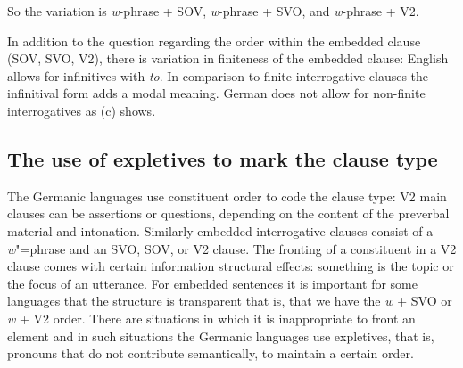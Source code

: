 So the variation is \emph{w}-phrase + SOV, \emph{w}-phrase + SVO, and \emph{w}-phrase + V2.

In addition to the question regarding the order within the embedded clause (SOV, SVO, V2), there is
variation in finiteness of the embedded clause:
\eal
\label{ex-what-to-read}
\zl
English allows for infinitives with \emph{to}. In comparison to finite interrogative clauses the
infinitival form adds a modal meaning. German does not allow for non-finite interrogatives as
(c) shows.



\subsection{The use of expletives to mark the clause type}
\label{sec-phen-use-of-expletives}

The Germanic languages use constituent order to code the clause type: V2 main clauses can be
assertions or questions, depending on the content of the preverbal material and
intonation. Similarly embedded interrogative clauses consist of a \emph{w}"=phrase and an SVO, SOV,
or V2 clause. The fronting of a constituent in a V2 clause comes with certain information structural
effects: something is the topic or the focus of an utterance. For embedded sentences it is important
for some languages that the structure is transparent that is, that we have the \emph{w} + SVO or
\emph{w} + V2 order. There are situations in which it is inappropriate to front an element and in
such situations the Germanic languages use expletives, that is, pronouns that do not contribute
semantically, to maintain a certain order.

